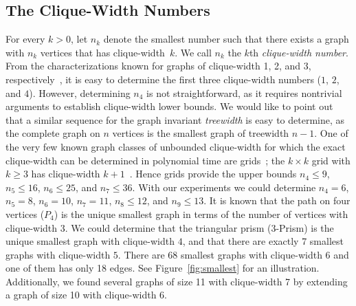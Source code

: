 \documentclass[10pt,usletter]{article}
\theoremstyle{remark}
\begin{document}
\subsection{The Clique-Width Numbers}
 
For every $k>0$, let $n_k$ denote the smallest number such that there
exists a graph with $n_k$ vertices that has clique-width~$k$. We call
$n_k$ the $k$th \emph{clique-width number}.  From the
characterizations known for graphs of clique-width 1, 2, and 3,
respectively~\cite{CornelEtal12}, it is easy to determine the first
three clique-width numbers ($1$, $2$, and $4$). However, determining
$n_4$ is not straightforward, as it requires nontrivial arguments to
establish clique-width lower bounds.  We would like to point out that
a similar sequence for the graph invariant \emph{treewidth} is easy to
determine, as the complete graph on $n$ vertices is the smallest graph
of treewidth $n-1$.  One of the very few known graph classes of
unbounded clique-width for which the exact clique-width can be
determined in polynomial time are
grids~\cite{HeggernesMeisterRotics11}; the $k \times k$ grid with $k
\geq 3$ has clique-width $k+1$~\cite{GolumbicRotics00}.  Hence grids
provide the upper bounds $n_4 \leq 9$, $n_5\leq 16$, $n_6 \leq 25$,
and $n_7 \leq 36$.  With our experiments we could determine $n_4=6$,
$n_5=8$, $n_6 = 10$, $n_7=11$, $n_8 \leq 12$, and $n_9 \leq 13$.  It
is known that the path on four vertices ($P_4$) is the unique smallest
graph in terms of the number of vertices with clique-width 3. We could
determine that the triangular prism (\mbox{3-Prism}) is the unique
smallest graph with clique-width $4$, and that there are exactly 7
smallest graphs with clique-width $5$.
There are 68 smallest graphs with clique-width 6 and one of them has
only 18 edges. See Figure~\ref{fig:smallest} for an illustration. 
Additionally, we found several graphs of size 11 with clique-width 7
by extending a graph of size 10 with clique-width 6.
\end{document}
